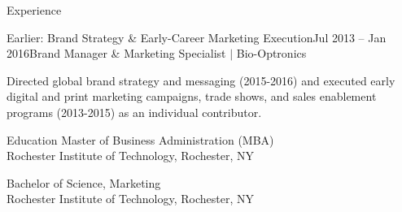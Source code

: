 \documentclass{resume}
\begin{document}
\begin{rSection}{Experience}
\begin{rSubsection}{Earlier: Brand Strategy \& Early-Career Marketing Execution}{\textcolor{black!60}{Jul 2013 -- Jan 2016}}{Brand Manager \& Marketing Specialist $\vert$ Bio-Optronics}{}
\item Directed global brand strategy and messaging (2015-2016) and executed early digital and print marketing campaigns, trade shows, and sales enablement programs (2013-2015) as an individual contributor.
\end{rSubsection}

\end{rSection}
\vspace{-0.15cm}


\begin{rSection}{Education}
{Master of Business Administration (MBA)} \hfill {\textcolor{black!60}{}}\\
{Rochester Institute of Technology}, Rochester, NY

{Bachelor of Science, Marketing} \hfill {\textcolor{black!60}{}}\\
{Rochester Institute of Technology}, Rochester, NY
\end{rSection}
\end{document}
